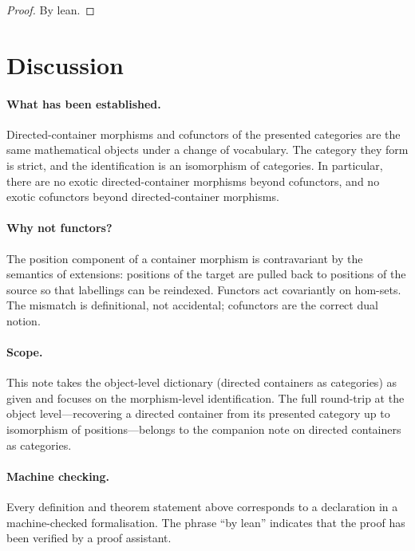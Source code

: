 \documentclass[11pt,a4paper]{article}
\theoremstyle{plain}
\theoremstyle{definition}
\begin{document}
\begin{proof}
By lean.
\end{proof}

\section{Discussion}

\paragraph{What has been established.}
Directed-container morphisms and cofunctors of the presented categories are
the same mathematical objects under a change of vocabulary. The category they
form is strict, and the identification is an isomorphism of categories. In
particular, there are no exotic directed-container morphisms beyond cofunctors,
and no exotic cofunctors beyond directed-container morphisms.

\paragraph{Why not functors?}
The position component of a container morphism is contravariant by the
semantics of extensions: positions of the target are pulled back to positions
of the source so that labellings can be reindexed. Functors act covariantly on
hom-sets. The mismatch is definitional, not accidental; cofunctors are the
correct dual notion.

\paragraph{Scope.}
This note takes the object-level dictionary (directed containers as
categories) as given and focuses on the morphism-level identification. The
full round-trip at the object level---recovering a directed container from its
presented category up to isomorphism of positions---belongs to the companion
note on directed containers as categories.

\paragraph{Machine checking.}
Every definition and theorem statement above corresponds to a declaration in a
machine-checked formalisation. The phrase ``by lean'' indicates that the proof
has been verified by a proof assistant.
\end{document}
